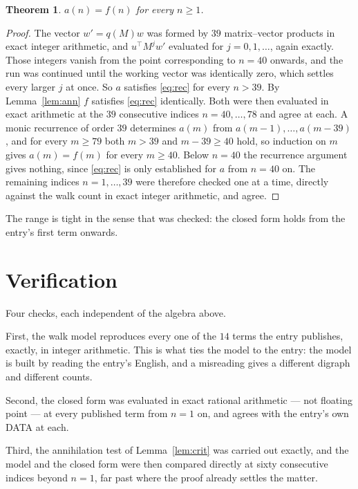 \documentclass[11pt,a4paper]{article}
\theoremstyle{plain}
\newtheorem{theorem}{Theorem}
\theoremstyle{definition}
\begin{document}
\begin{theorem}
$a(n)=f(n)$ for every $n\ge1$.
\end{theorem}

\begin{proof}
The vector $w'=q(M)w$ was formed by $39$ matrix--vector products in exact integer
arithmetic, and $u^{\!\top}M^{j}w'$ evaluated for $j=0,1,\dots$, again exactly. Those integers
vanish from the point corresponding to $n=40$ onwards, and the run was continued until the
working vector was identically zero, which settles every larger $j$ at once. So $a$ satisfies
\eqref{eq:rec} for every $n>39$. By Lemma~\ref{lem:ann} $f$ satisfies \eqref{eq:rec}
identically. Both were then evaluated in exact arithmetic at the $39$ consecutive indices
$n=40,\dots,78$ and agree at each. A monic recurrence of order $39$
determines $a(m)$ from $a(m-1),\dots,a(m-39)$, and for every $m\ge79$ both
$m>39$ and $m-39\ge40$ hold, so induction on $m$ gives $a(m)=f(m)$ for every
$m\ge40$.
Below $n=40$ the recurrence argument gives nothing, since \eqref{eq:rec} is only
established for $a$ from $n=40$ on. The remaining indices $n=1,\dots,39$ were
therefore checked one at a time, directly against the walk count in exact integer arithmetic,
and agree.
\end{proof}

The range is tight in the sense that was checked: the closed form holds from the entry's first term onwards.

\section{Verification}

Four checks, each independent of the algebra above.

First, the walk model reproduces every one of the $14$ terms the entry publishes,
exactly, in integer arithmetic. This is what ties the model to the entry: the model is built
by reading the entry's English, and a misreading gives a different digraph and different
counts.

Second, the closed form was evaluated in exact rational arithmetic --- not floating point ---
at every published term from $n=1$ on, and agrees with the entry's own DATA at each.

Third, the annihilation test of Lemma~\ref{lem:crit} was carried out exactly, and the model
and the closed form were then compared directly at sixty consecutive indices beyond
$n=1$, far past where the proof already settles the matter.
\end{document}
